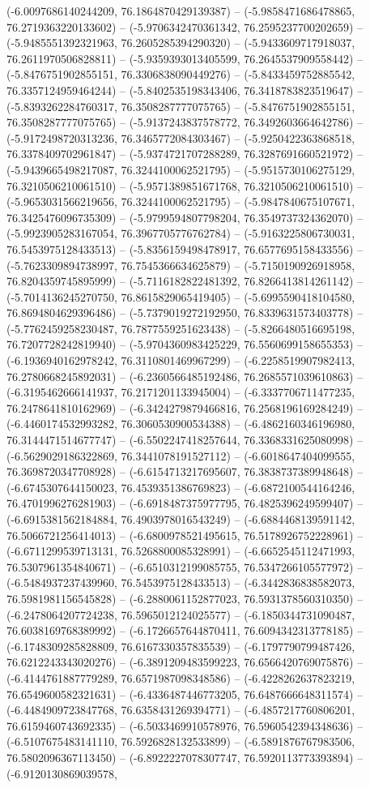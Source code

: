 (-6.0097686140244209, 76.1864870429139387) -- (-5.9858471686478865, 76.2719363220133602) -- (-5.9706342470361342, 76.2595237700202659) -- (-5.9485551392321963, 76.2605285394290320) -- (-5.9433609717918037, 76.2611970506828811) -- (-5.9359393013405599, 76.2645537909558442) -- (-5.8476751902855151, 76.3306838090449276) -- (-5.8433459752885542, 76.3357124959464244) -- (-5.8402535198343406, 76.3418783823519647) -- (-5.8393262284760317, 76.3508287777075765) -- (-5.8476751902855151, 76.3508287777075765) -- (-5.9137243837578772, 76.3492603664642786) -- (-5.9172498720313236, 76.3465772084303467) -- (-5.9250422363868518, 76.3378409702961847) -- (-5.9374721707288289, 76.3287691660521972) -- (-5.9439665498217087, 76.3244100062521795) -- (-5.9515730106275129, 76.3210506210061510) -- (-5.9571389851671768, 76.3210506210061510) -- (-5.9653031566219656, 76.3244100062521795) -- (-5.9847840675107671, 76.3425476096735309) -- (-5.9799594807798204, 76.3549737324362070) -- (-5.9923905283167054, 76.3967705776762784) -- (-5.9163225806730031, 76.5453975128433513) -- (-5.8356159498478917, 76.6577695158433556) -- (-5.7623309894738997, 76.7545366634625879) -- (-5.7150190926918958, 76.8204359745895999) -- (-5.7116182822481392, 76.8266413814261142) -- (-5.7014136245270750, 76.8615829065419405) -- (-5.6995590418104580, 76.8694804629396486) -- (-5.7379019272192950, 76.8339631573403778) -- (-5.7762459258230487, 76.7877559251623438) -- (-5.8266480516695198, 76.7207728242819940) -- (-5.9704360983425229, 76.5560699158655353) -- (-6.1936940162978242, 76.3110801469967299) -- (-6.2258519907982413, 76.2780668245892031) -- (-6.2360566485192486, 76.2685571039610863) -- (-6.3195462666141937, 76.2171201133945004) -- (-6.3337706711477235, 76.2478641810162969) -- (-6.3424279879466816, 76.2568196169284249) -- (-6.4460174532993282, 76.3060530900534388) -- (-6.4862160346196980, 76.3144471514677747) -- (-6.5502247418257644, 76.3368331625080998) -- (-6.5629029186322869, 76.3441078191527112) -- (-6.6018647404099555, 76.3698720347708928) -- (-6.6154713217695607, 76.3838737389948648) -- (-6.6745307644150023, 76.4539351386769823) -- (-6.6872100544164246, 76.4701996276281903) -- (-6.6918487375977795, 76.4825396249599407) -- (-6.6915381562184884, 76.4903978016543249) -- (-6.6884468139591142, 76.5066721256414013) -- (-6.6800978521495615, 76.5178926752228961) -- (-6.6711299539713131, 76.5268800085328991) -- (-6.6652545112471993, 76.5307961354840671) -- (-6.6510312199085755, 76.5347266105577972) -- (-6.5484937237439960, 76.5453975128433513) -- (-6.3442836838582073, 76.5981981156545828) -- (-6.2880061152877023, 76.5931378560310350) -- (-6.2478064207724238, 76.5965012124025577) -- (-6.1850344731090487, 76.6038169768389992) -- (-6.1726657644870411, 76.6094342313778185) -- (-6.1748309285828809, 76.6167330357835539) -- (-6.1797790799487426, 76.6212243343020276) -- (-6.3891209483599223, 76.6566420769075876) -- (-6.4144761887779289, 76.6571987098348586) -- (-6.4228262637823219, 76.6549600582321631) -- (-6.4336487446773205, 76.6487666648311574) -- (-6.4484909723847768, 76.6358431269394771) -- (-6.4857217760806201, 76.6159460743692335) -- (-6.5033469910578976, 76.5960542394348636) -- (-6.5107675483141110, 76.5926828132533899) -- (-6.5891876767983506, 76.5802096367113450) -- (-6.8922227078307747, 76.5920113773393894) -- (-6.9120130869039578, 